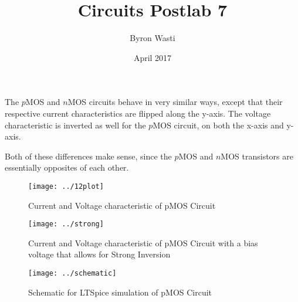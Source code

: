 \documentclass{article}
\title{Circuits Postlab 7}
\author{Byron Wasti}
\date{April 2017}
\begin{document}
\maketitle

The $p$MOS and $n$MOS circuits behave in very similar ways, except that their respective current characteristics are flipped along the y-axis. The voltage characteristic is inverted as well for the $p$MOS circuit, on both the x-axis and y-axis.

Both of these differences make sense, since the $p$MOS and $n$MOS transistors are essentially opposites of each other.

\begin{figure}[h]
    \centering
    \texttt{[image: ../12plot]}
    \caption{Current and Voltage characteristic of pMOS Circuit}
    \label{fig:two}
\end{figure}

\begin{figure}[h]
    \centering
    \texttt{[image: ../strong]}
    \caption{Current and Voltage characteristic of pMOS Circuit with a bias voltage that allows for Strong Inversion}
    \label{fig:strong}
\end{figure}

\begin{figure}[h]
    \centering
    \texttt{[image: ../schematic]}
    \caption{Schematic for LTSpice simulation of pMOS Circuit}
    \label{fig:s}
\end{figure}
\end{document}
